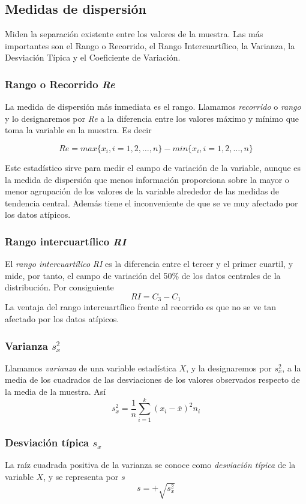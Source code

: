 \subsection{Medidas de dispersión}
Miden la separación existente entre los valores de la muestra. Las
más importantes son el Rango o Recorrido, el Rango Intercuartílico,
la Varianza, la Desviación Típica y el Coeficiente de Variación.
\subsubsection{Rango o Recorrido \textit{Re}}
La medida de dispersión más inmediata es el rango. Llamamos
\emph{recorrido} o \emph{rango} y lo designaremos por \textit{Re} a
la diferencia entre los valores máximo y mínimo que toma la variable
en la muestra. Es decir

    \[Re = max\{x_i, i=1,2,\ldots,n\} - min\{x_i, i=1,2,\ldots,n\}\]


Este estadístico sirve para medir el campo de variación de la
variable, aunque es la medida de dispersión que menos información
proporciona sobre la mayor o menor agrupación de los valores de la
variable alrededor de las medidas de tendencia central. Además tiene
el inconveniente de que se ve muy afectado por los datos atípicos.

\subsubsection{Rango intercuartílico \textit{RI}}
El \emph{rango intercuartílico} \textit{RI} es la diferencia entre
el tercer y el primer cuartil, y mide, por tanto, el campo de
variación del 50\% de los datos centrales de la distribución. Por
consiguiente
\[ RI=C_3-C_1\]
La ventaja del rango intercuartílico frente al recorrido es que no se ve tan afectado por los datos atípicos.

\subsubsection{Varianza $\textit{s}_\textit{x}^\textrm{2}$}
Llamamos \emph{varianza} de una variable estadística $X$, y la
designaremos por $\textit{s}_\textit{x}^\textrm{2}$, a la media de
los cuadrados de las desviaciones de los valores observados respecto
de la media de la muestra. Así
\[s_x^{2}=\frac{1}{n}\sum_{i=1}^{k}(x_i-\overline{x})^{2}n_i\]

\subsubsection{Desviación típica $\textit{s}_\textit{x}$}
La raíz cuadrada positiva de la varianza se conoce como
\emph{desviación típica} de la variable $X$, y se representa por $s$
\[s=+\sqrt{s_{x}^{2}}\]

